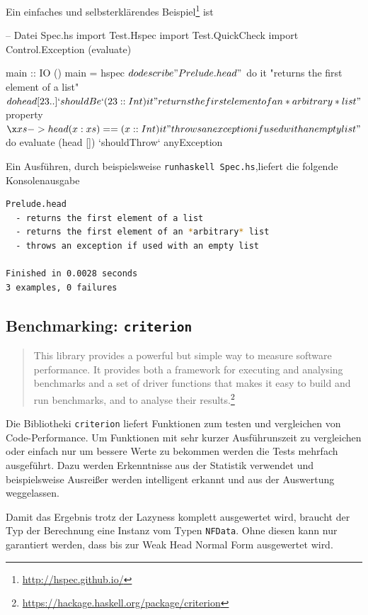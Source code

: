 Ein einfaches und selbsterklärendes
Beispiel\footnote{\url{http://hspec.github.io/}} ist
\begin{hcode}
-- Datei Spec.hs
import Test.Hspec
import Test.QuickCheck
import Control.Exception (evaluate)

main :: IO ()
main = hspec $ do
  describe "Prelude.head" $ do
    it "returns the first element of a list" $ do
      head [23 ..] `shouldBe` (23 :: Int)

    it "returns the first element of an *arbitrary* list" $
      property $ \x xs -> head (x:xs) == (x :: Int)

    it "throws an exception if used with an empty list" $ do
      evaluate (head []) `shouldThrow` anyException
\end{hcode}
Ein Ausführen, durch beispielsweise \texttt{runhaskell Spec.hs},liefert die folgende
Konsolenausgabe
\begin{lstlisting}[language=bash 
                  ,numbers=none
                  ,backgroundcolor=\color{lightgray}]
Prelude.head
  - returns the first element of a list
  - returns the first element of an *arbitrary* list
  - throws an exception if used with an empty list

Finished in 0.0028 seconds
3 examples, 0 failures
\end{lstlisting}

\subsection{Benchmarking: \texttt{criterion}}
\begin{quote}
  This library provides a powerful but simple way to measure software
  performance. It provides both a framework for executing and analysing
  benchmarks and a set of driver functions that makes it easy to build and run
  benchmarks, and to analyse their
  results.\footnote{\url{https://hackage.haskell.org/package/criterion}}
\end{quote}
Die Bibliotheki \texttt{criterion} liefert Funktionen zum testen und vergleichen
von Code-Performance.
Um Funktionen mit sehr kurzer Ausführunszeit zu vergleichen oder einfach nur um
bessere Werte zu bekommen werden die Tests mehrfach ausgeführt.
Dazu werden Erkenntnisse aus der Statistik verwendet und beispielsweise
Ausreißer werden intelligent erkannt und aus der Auswertung weggelassen.

Damit das Ergebnis trotz der Lazyness komplett ausgewertet wird, braucht der
Typ der Berechnung eine Instanz vom Typen \texttt{NFData}. Ohne diesen kann nur
garantiert werden, dass bis zur Weak Head Normal Form ausgewertet wird.

